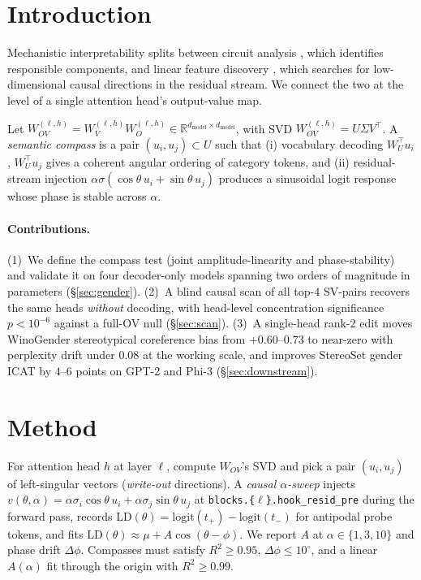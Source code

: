 \section{Introduction}
\label{sec:intro}

Mechanistic interpretability splits between circuit analysis
\citep{elhage2021mathematical,wang2023interpretability,conmy2023acdc},
which identifies responsible components, and linear feature discovery
\citep{park2024linearrep,geiger2024das,marks2024geometry,engels2024not},
which searches for low-dimensional causal directions in the residual
stream. We connect the two at the level of a single attention head's
output-value map.

Let $W_{OV}^{(\ell,h)} = W_V^{(\ell,h)} W_O^{(\ell,h)}
\in \mathbb{R}^{d_\text{model}\times d_\text{model}}$, with SVD
$W_{OV}^{(\ell,h)} = U\Sigma V^{\top}$. A \emph{semantic compass}
is a pair $(u_i, u_j) \subset U$ such that (i) vocabulary decoding
$W_U^{\top}u_i$, $W_U^{\top}u_j$ gives a coherent angular ordering
of category tokens, and (ii) residual-stream injection
$\alpha\sigma(\cos\theta\,u_i + \sin\theta\,u_j)$ produces a
sinusoidal logit response whose phase is stable across $\alpha$.

\paragraph{Contributions.}
(1)~We define the compass test (joint amplitude-linearity and
phase-stability) and validate it on four decoder-only models spanning
two orders of magnitude in parameters (\S\ref{sec:gender}).
(2)~A blind causal scan of all top-$4$ SV-pairs
recovers the same heads \emph{without} decoding, with head-level
concentration significance $p < 10^{-6}$ against a full-OV null
(\S\ref{sec:scan}).
(3)~A single-head rank-$2$ edit moves WinoGender stereotypical
coreference bias from $+0.60\text{--}0.73$ to near-zero with
perplexity drift under $0.08$ at the working scale, and improves
StereoSet gender ICAT by $4\text{--}6$ points on GPT-2 and Phi-3
(\S\ref{sec:downstream}).

\section{Method}
\label{sec:method}

For attention head $h$ at layer $\ell$, compute $W_{OV}$'s SVD and pick
a pair $(u_i, u_j)$ of left-singular vectors (\emph{write-out}
directions). A \emph{causal $\alpha$-sweep} injects
$v(\theta,\alpha) = \alpha\sigma_i\cos\theta\,u_i +
 \alpha\sigma_j\sin\theta\,u_j$
at \texttt{blocks.\{$\ell$\}.hook\_resid\_pre} during the forward pass,
records $\mathrm{LD}(\theta) = \mathrm{logit}(t_{+}) - \mathrm{logit}(t_{-})$
for antipodal probe tokens, and fits
$\mathrm{LD}(\theta)\approx\mu + A\cos(\theta - \phi)$. We report $A$
at $\alpha\in\{1,3,10\}$ and phase drift $\Delta\phi$. Compasses must
satisfy $R^2\ge 0.95$, $\Delta\phi\le 10^\circ$, and a linear
$A(\alpha)$ fit through the origin with $R^2 \ge 0.99$.

